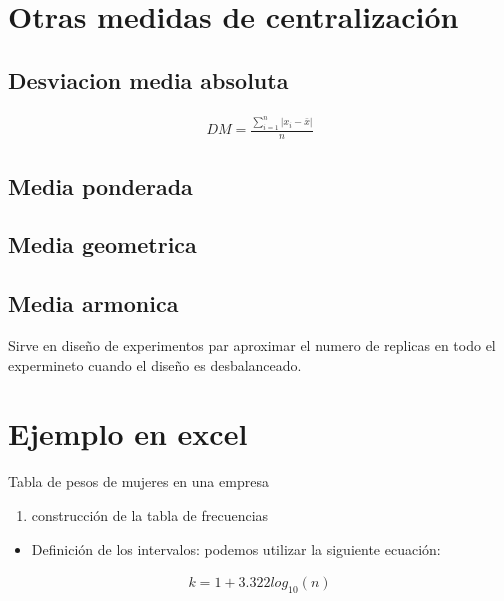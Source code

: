 \documentclass[twocolumn]{article}
\providecommand{\tightlist}{%
  \setlength{\itemsep}{0pt}\setlength{\parskip}{0pt}}
\begin{document}
\section{Otras medidas de
centralización}\label{otras-medidas-de-centralizaciuxf3n}

\subsection{Desviacion media absoluta}\label{desviacion-media-absoluta}

\begin{align}
DM = \frac{\sum_{i = 1}^n |x_i - \bar{x}|}{n}
\end{align}

\subsection{Media ponderada}\label{media-ponderada}

\subsection{Media geometrica}\label{media-geometrica}

\subsection{Media armonica}\label{media-armonica}

Sirve en diseño de experimentos par aproximar el numero de replicas en
todo el expermineto cuando el diseño es desbalanceado.

\section{Ejemplo en excel}\label{ejemplo-en-excel}

Tabla de pesos de mujeres en una empresa

\begin{enumerate}
\def\labelenumi{\arabic{enumi}.}
\tightlist
\item
  construcción de la tabla de frecuencias
\end{enumerate}

\begin{itemize}
\tightlist
\item
  Definición de los intervalos: podemos utilizar la siguiente ecuación:
\end{itemize}

\begin{align}
k = 1 + 3.322 log_{10} (n)
\end{align}
\end{document}
